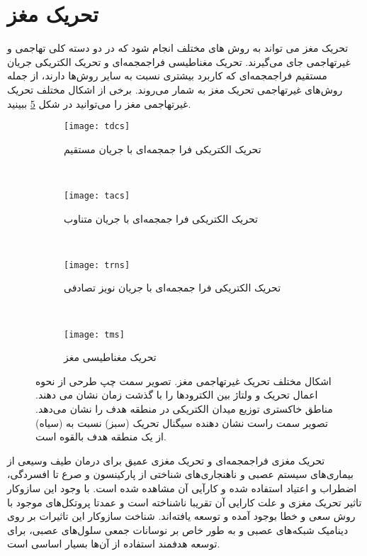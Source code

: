 \section{تحریک مغز}

تحریک مغز می تواند به روش های مختلف انجام شود که در دو دسته کلی تهاجمی و غیرتهاجمی جای می‌گیرند. تحریک مغناطیسی فراجمجمه‌ای 
و تحریک الکتریکی جریان مستقیم فراجمجمه‌ای
که کاربرد بیشتری نسبت به سایر روش‌ها دارند، از جمله روش‌های غیرتهاجمی تحریک مغز به شمار می‌روند.
برخی از اشکال مختلف تحریک غیرتهاجمی مغز را می‌توانید در شکل 
\ref{fig:nibs}
ببینید.

\begin{figure}
     \centering
     \begin{subfigure}[t]{0.7\textwidth}
         \centering
         \texttt{[image: tdcs]}
         \caption{تحریک الکتریکی فرا جمجمه‌ای با جریان مستقیم }
         \label{fig:tdcs}
     \end{subfigure}
     \\
     \begin{subfigure}[t]{0.7\textwidth}
         \centering
         \texttt{[image: tacs]}
         \caption{    تحریک الکتریکی فرا جمجمه‌ای با جریان متناوب }
         \label{fig:tacs}
     \end{subfigure}
     \\
     \begin{subfigure}[t]{0.7\textwidth}
         \centering
         \texttt{[image: trns]}
         \caption{    تحریک الکتریکی فرا جمجمه‌ای با جریان نویز تصادفی}
         \label{fig:trns}
     \end{subfigure}
     \\
         \begin{subfigure}[t]{0.7\textwidth}
         \centering
         \texttt{[image: tms]}
         \caption{تحریک مغناطیسی مغز}
         \label{fig:tms}
     \end{subfigure}
        \caption{اشکال مختلف تحریک غیرتهاجمی مغز. تصویر سمت چپ طرحی از نحوه اعمال تحریک و ولتاژ بین الکترودها را با گذشت زمان نشان می دهند. مناطق خاکستری توزیع میدان الکتریکی  در منطقه هدف را نشان می‌دهد. تصویر سمت راست نشان دهنده سیگنال تحریک (سبز) نسبت به  (سیاه) از یک منطقه هدف بالقوه است.
         }
        \label{fig:nibs}
\end{figure}

تحریک مغزی فراجمجمه‌ای و تحریک مغزی عمیق برای درمان طیف وسیعی از بیماری‌های سیستم عصبی و ناهنجاری‌های شناختی از پارکینسون و صرع تا افسردگی، اضطراب و اعتیاد استفاده شده و کارآیی آن مشاهده شده است. با وجود این سازوکار تاثیر تحریک مغزی و علت کارایی آن تقریبا ناشناخته است و عمدتا پروتکل‌های موجود با روش سعی و خطا بوجود آمده و توسعه یافته‌اند. شناخت سازوکار این تاثیرات بر روی دینامیک شبکه‌های عصبی و به طور خاص بر نوسانات جمعی سلول‌های عصبی، برای توسعه هدفمند استفاده از آن‌ها بسیار اساسی است. 


